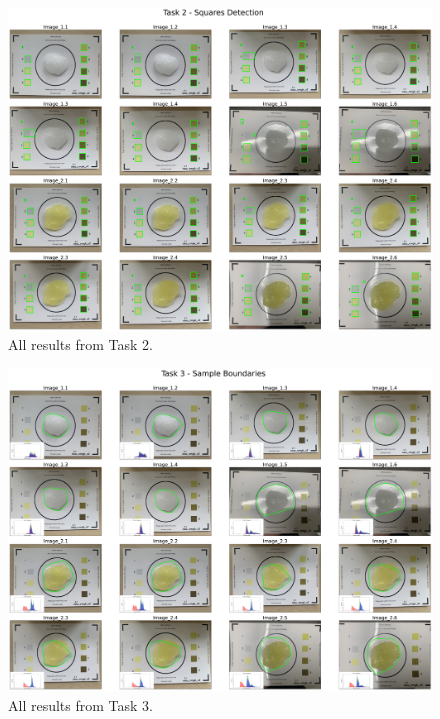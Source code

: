 \documentclass[12pt]{article}
\begin{document}
\newpage

\begin{figure}[h]
    \centerline{\includegraphics[width=\textwidth]{figs/task2.pdf}} 
	\caption{All results from Task 2.}
	\label{fig: task2-all}
\end{figure}

\newpage 

\begin{figure}[h]
    \centerline{\includegraphics[width=\textwidth]{figs/task3.pdf}} 
	\caption{All results from Task 3.}
	\label{fig: task3-all}
\end{figure}
\end{document}
